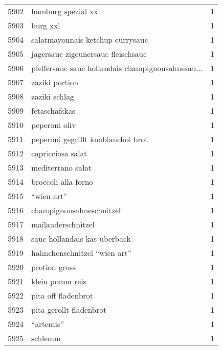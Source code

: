 \begin{tabular}{llr}
5902 &                                hamburg spezial xxl &      1 \\
5903 &                                           burg xxl &      1 \\
5904 &                   salatmayonnais ketchup currysauc &      1 \\
5905 &                 jagersauc zigeunersauc fleischsauc &      1 \\
5906 &  pfeffersauc sauc hollandais champignonsahnesau... &      1 \\
5907 &                                     zaziki portion &      1 \\
5908 &                                      zaziki schlag &      1 \\
5909 &                                      fetaschafskas &      1 \\
5910 &                                      peperoni oliv &      1 \\
5911 &                 peperoni gegrillt knoblauchol brot &      1 \\
5912 &                                  capricciosa salat &      1 \\
5913 &                                  mediterrano salat &      1 \\
5914 &                                broccoli alla forno &      1 \\
5915 &                                         “wien art” &      1 \\
5916 &                           champignonsahneschnitzel &      1 \\
5917 &                                 mailanderschnitzel &      1 \\
5918 &                       sauc hollandais kas uberback &      1 \\
5919 &                       hahnchenschnitzel “wien art” &      1 \\
5920 &                                      protion gross &      1 \\
5921 &                                    klein pomm reis &      1 \\
5922 &                                pita off fladenbrot &      1 \\
5923 &                            pita gerollt fladenbrot &      1 \\
5924 &                                          “artemis” &      1 \\
5925 &                                            schlemm &      1 \\

\end{tabular}
